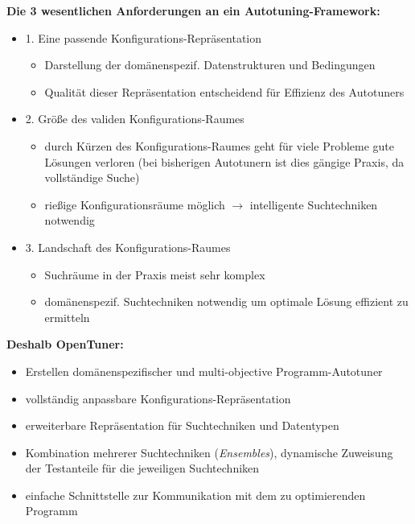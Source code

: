     \begin{frame}
    \textbf{Die 3 wesentlichen Anforderungen an ein Autotuning-Framework:}
    
    \begin{itemize}
       
    \item 1. Eine passende Konfigurations-Repräsentation
        \begin{itemize}
          \item Darstellung der domänenspezif. Datenstrukturen und Bedingungen
          \item Qualität dieser Repräsentation entscheidend für Effizienz des Autotuners \newline
        \end{itemize}
        
    \item 2. Größe des validen Konfigurations-Raumes
        \begin{itemize}
          \item durch Kürzen des Konfigurations-Raumes geht für viele Probleme gute Lösungen verloren
          (bei bisherigen Autotunern ist dies gängige Praxis, da vollständige Suche)
          \item rießige Konfigurationsräume möglich $\rightarrow$  intelligente Suchtechniken notwendig \newline
        \end{itemize}
        
    \item 3. Landschaft des Konfigurations-Raumes
      \begin{itemize}
        \item Suchräume in der Praxis meist sehr komplex 
        \item domänenspezif. Suchtechniken notwendig um optimale Lösung effizient zu ermitteln
      \end{itemize}
               
    \end{itemize}
    \end{frame}
    

    \begin{frame}
    \textbf{Deshalb OpenTuner:}
    
    \begin{itemize}
      \item Erstellen domänenspezifischer und multi-objective Programm-Autotuner
      \item vollständig anpassbare Konfigurations-Repräsentation
      \item erweiterbare Repräsentation für Suchtechniken und Datentypen
      \item Kombination mehrerer Suchtechniken (\textit{Ensembles}), dynamische Zuweisung der
      Testanteile für die jeweiligen Suchtechniken
      \item einfache Schnittstelle zur Kommunikation mit dem zu optimierenden Programm           
    \end{itemize}
    \end{frame}

